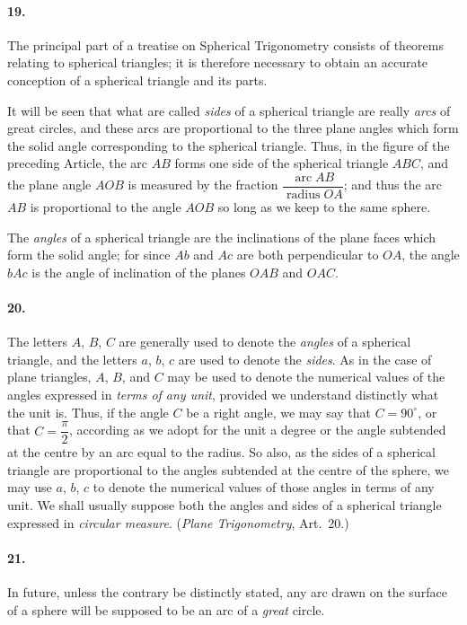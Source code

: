 \documentclass{book}[2004/02/16]
\begin{document}
\begin{mainmatter}
\begin{spacing}{1.3}
\paragraph{19.} The principal part of a treatise on Spherical Trigonometry
consists of theorems relating to spherical triangles; it is therefore
necessary to obtain an accurate conception of a spherical triangle
and its parts.

It will be seen that what are called \textit{sides} of a spherical
triangle are really \textit{arcs} of great circles, and these arcs are proportional
to the three plane angles which form the solid angle
corresponding to the spherical triangle. Thus, in the figure of
the preceding Article, the arc $AB$ forms one side of the spherical
triangle $ABC$, and the plane angle $AOB$ is measured by the fraction
$\dfrac{\operatorname{arc} AB} {\operatorname{radius} OA}$; and thus the arc $AB$ is proportional to the angle
$AOB$ so long as we keep to the same sphere.

The \textit{angles} of a spherical triangle are the inclinations of the
plane faces which form the solid angle; for since $Ab$ and $Ac$ are
both perpendicular to $OA$, the angle $bAc$ is the angle of inclination
of the planes $OAB$ and $OAC$.

\paragraph{20.} The letters $A$, $B$, $C$ are generally used to denote the
\textit{angles} of a spherical triangle, and the letters $a$, $b$, $c$ are used to
denote the \textit{sides}. As in the case of plane triangles, $A$, $B$, and $C$
may be used to denote the numerical values of the angles expressed
in \textit{terms of any unit}, provided we understand distinctly what the
unit is. Thus, if the angle $C$ be a right angle, we may say that
$C = 90^\circ$, or that $C = \dfrac{\pi}{2}$, according as we adopt for the unit a degree
or the angle subtended at the centre by an arc equal to the
radius. So also, as the sides of a spherical triangle are proportional
to the angles subtended at the centre of the sphere, we
may use $a$, $b$, $c$ to denote the numerical values of those angles
in terms of any unit. We shall usually suppose both the angles
and sides of a spherical triangle expressed in \textit{circular measure}.
(\textit{Plane Trigonometry}, Art.\ 20.)

\paragraph{21.} In future, unless the contrary be distinctly stated, any
arc drawn on the surface of a sphere will be supposed to be an arc
of a \textit{great} circle.


\end{spacing}
\end{mainmatter}
\end{document}
